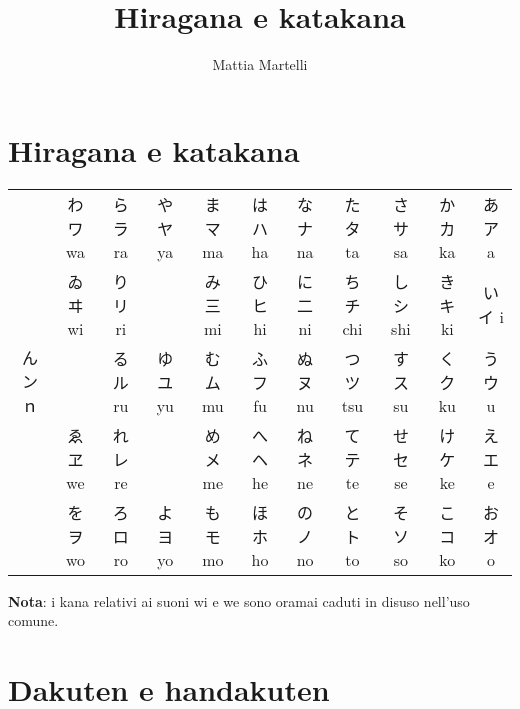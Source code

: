 \documentclass{article}
\title{Hiragana e katakana}
\author{Mattia Martelli}
\begin{document}
    \maketitle

    \tableofcontents

    \section{Hiragana e katakana}

        \centering
        \begin{japanese}
            \begin{tabular}{|c|c|c|c|c|c|c|c|c|c|c|}
                \hline
                \multirow{5}{*}{ん ン ｎ}
                    & わ ワ wa & ら ラ ra & や ヤ ya & ま マ ma & は ハ ha & な ナ na & た タ ta & さ サ sa & か カ ka & あ ア a\\
                    \cline{2-11}
                    & ゐ ヰ wi & り リ ri & & み 三 mi & ひ ヒ hi & に 二 ni & ち チ chi & し シ shi & き キ ki & い イ i\\
                    \cline{2-11}
                    & & る ル ru & ゆ ユ yu & む ム mu & ふ フ fu & ぬ ヌ nu & つ ツ tsu & す ス su & く ク ku & う ウ u\\
                    \cline{2-11}
                    & ゑ ヱ we & れ レ re & & め メ me & へ ヘ he & ね ネ ne & て テ te & せ セ se & け ケ ke & え エ e\\
                    \cline{2-11}
                    & を ヲ wo & ろ ロ ro & よ ヨ yo & も モ mo & ほ ホ ho & の ノ no & と ト to & そ ソ so & こ コ ko & お オ o\\
                \hline
            \end{tabular}
        \end{japanese}

        \bigskip

        \textbf{Nota}: i kana relativi ai suoni \textjapanese{wi} e \textjapanese{we} sono oramai caduti in disuso nell'uso comune.

    \section{Dakuten e handakuten}
\end{document}
